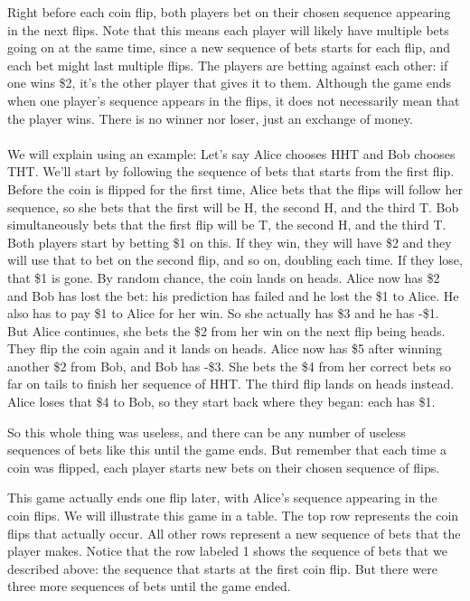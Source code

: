 \documentclass[english,12pt,a4paper,final]{article}
\begin{document}
Right before each coin flip, both players bet on their chosen sequence appearing in the next flips. Note that this means each player will likely have multiple bets going on at the same time, since a new sequence of bets starts for each flip, and each bet might last multiple flips. The players are betting against each other: if one wins \$2, it's the other player that gives it to them. Although the game ends when one player's sequence appears in the flips, it does not necessarily mean that the player wins. There is no winner nor loser, just an exchange of money.
\\\\
We will explain using an example: Let's say Alice chooses HHT and Bob chooses THT. We'll start by following the sequence of bets that starts from the first flip. Before the coin is flipped for the first time, Alice bets that the flips will follow her sequence, so she bets that the first will be H, the second H, and the third T. Bob simultaneously bets that the first flip will be T, the second H, and the third T. Both players start by betting \$1 on this. If they win, they will have \$2 and they will use that to bet on the second flip, and so on, doubling each time. If they lose, that \$1 is gone. By random chance, the coin lands on heads. Alice now has \$2 and Bob has lost the bet: his prediction has failed and he lost the \$1 to Alice. He also has to pay \$1 to Alice for her win. So she actually has \$3 and he has -\$1. But Alice continues, she bets the \$2 from her win on the next flip being heads. They flip the coin again and it lands on heads. Alice  now has \$5 after winning another \$2 from Bob, and Bob has -\$3. She bets the \$4 from her correct bets so far on tails to finish her sequence of HHT. The third flip lands on heads instead. Alice loses that \$4 to Bob, so they start back where they began: each has \$1.

So this whole thing was useless, and there can be any number of useless sequences of bets like this until the game ends. But remember that each time a coin was flipped, each player starts new bets on their chosen sequence of flips.

This game actually ends one flip later, with Alice's sequence appearing in the coin flips. We will illustrate this game in a table. The top row represents the coin flips that actually occur. All other rows represent a new sequence of bets that the player makes. Notice that the row labeled 1 shows the sequence of bets that we described above: the sequence that starts at the first coin flip. But there were three more sequences of bets until the game ended.
\end{document}
